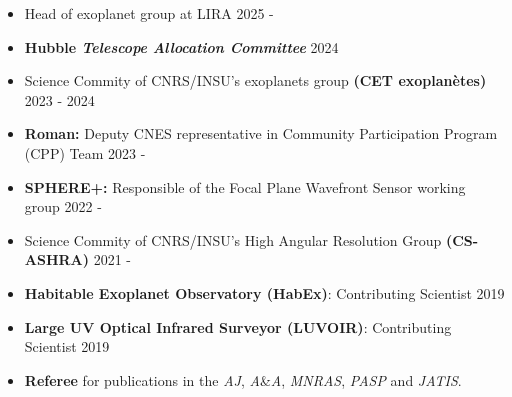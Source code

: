\documentclass[11pt]{article}
\begin{document}
\begin{itemize} \itemsep -2pt
    \item \small Head of exoplanet group at LIRA \hfill 2025 - 
    \item \small \textbf{Hubble \textit{Telescope Allocation Committee}} \hfill 2024
    \item \small Science Commity of CNRS/INSU's exoplanets group \textbf{(CET exoplanètes)}  \hfill 2023 - 2024
    \item \small \textbf{Roman:} Deputy CNES representative in Community Participation Program (CPP) Team  \hfill 2023 - 
    \item \small \textbf{SPHERE+:} Responsible of the Focal Plane Wavefront Sensor working group \hfill 2022 - 
    \item \small Science Commity of CNRS/INSU's High Angular Resolution Group \textbf{(CS-ASHRA)} \hfill 2021 - 
    \item \small \textbf{Habitable Exoplanet Observatory (HabEx)}: Contributing Scientist \hfill 2019
    \item \small \textbf{Large UV Optical Infrared Surveyor (LUVOIR)}: Contributing Scientist \hfill 2019
    \item \small \textbf{Referee} for publications in the \textit{AJ}, \textit{A}\&\textit{A}, \textit{MNRAS}, \textit{PASP} and \textit{JATIS}.
\end{itemize}





\end{document}
